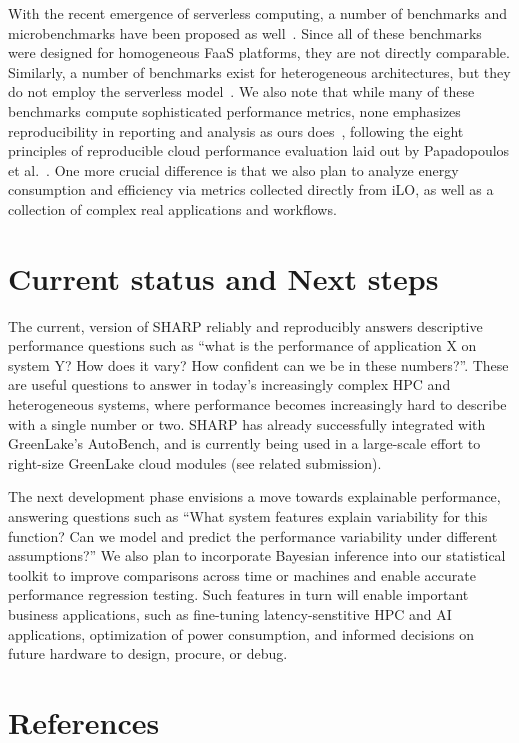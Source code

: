 \documentclass[11pt]{article}
\begin{document}
With the recent emergence of serverless computing, a number of benchmarks and microbenchmarks have been proposed as well~\cite{copik21:sebs, decker22:performance, hancock22:orcbench, kim19:practical, yu20:characterizing}.
Since all of these benchmarks were designed for homogeneous FaaS platforms, they are not directly comparable.
Similarly, a number of benchmarks exist for heterogeneous architectures, but they do not employ the serverless model~\cite{danalis10:scalable}.
We also note that while many of these benchmarks compute sophisticated performance metrics, none emphasizes reproducibility in reporting and analysis as ours does~\cite{scheuner20:review}, following the eight principles of reproducible cloud performance evaluation laid out by Papadopoulos et al.~\cite{papadopoulos19:methodological}.
One more crucial difference is that we also plan to analyze energy consumption and efficiency via metrics collected directly from iLO, as well as a collection of complex real applications and workflows.



\section*{Current status and Next steps}

The current, version of SHARP reliably and reproducibly answers descriptive performance questions such as ``what is the performance of application X on system Y? How does it vary? How confident can we be in these numbers?''.
These are useful questions to answer in today's increasingly complex HPC and heterogeneous systems, where performance becomes increasingly hard to describe with a single number or two.
SHARP has already successfully integrated with GreenLake's AutoBench, and is currently being used in a large-scale effort to right-size GreenLake cloud modules (see related submission).

The next development phase envisions a move towards explainable performance, answering questions such as ``What system features explain variability for this function? Can we model and predict the performance variability under different assumptions?''
We also plan to incorporate Bayesian inference into our statistical toolkit to improve comparisons across time or machines and enable accurate performance regression testing.
Such features in turn will enable important business applications, such as fine-tuning latency-senstitive HPC and AI applications, optimization of power consumption, and informed decisions on future hardware to design, procure, or debug.

\newpage
\section*{References}



\end{document}
